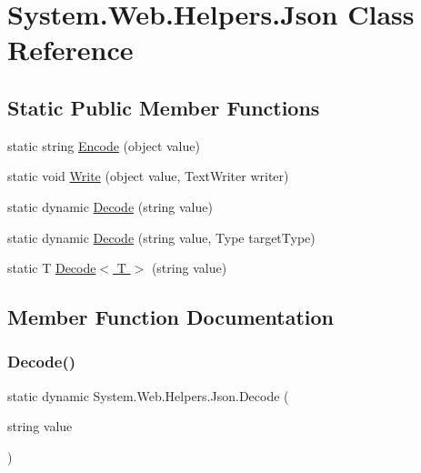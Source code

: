 \hypertarget{classSystem_1_1Web_1_1Helpers_1_1Json}{}\section{System.\+Web.\+Helpers.\+Json Class Reference}
\label{classSystem_1_1Web_1_1Helpers_1_1Json}
\subsection*{Static Public Member Functions}
\begin{DoxyCompactItemize}
\item 
static string \hyperlink{classSystem_1_1Web_1_1Helpers_1_1Json_a5234a572ff14b4546aca4a7ff265e9b5_a5234a572ff14b4546aca4a7ff265e9b5}{Encode} (object value)
\item 
static void \hyperlink{classSystem_1_1Web_1_1Helpers_1_1Json_a461c4677a0c7755a390cbe247d2cb106_a461c4677a0c7755a390cbe247d2cb106}{Write} (object value, Text\+Writer writer)
\item 
static dynamic \hyperlink{classSystem_1_1Web_1_1Helpers_1_1Json_a3a8e1162819227b88cbd2879cc05ecec_a3a8e1162819227b88cbd2879cc05ecec}{Decode} (string value)
\item 
static dynamic \hyperlink{classSystem_1_1Web_1_1Helpers_1_1Json_ab39872b59b78d9c417d2d81504768849_ab39872b59b78d9c417d2d81504768849}{Decode} (string value, Type target\+Type)
\item 
static T \hyperlink{classSystem_1_1Web_1_1Helpers_1_1Json_abd82655d76fcb16522303f1da4ced6c0_abd82655d76fcb16522303f1da4ced6c0}{Decode$<$ T $>$} (string value)
\end{DoxyCompactItemize}


\subsection{Member Function Documentation}
\mbox{\label{classSystem_1_1Web_1_1Helpers_1_1Json_a3a8e1162819227b88cbd2879cc05ecec_a3a8e1162819227b88cbd2879cc05ecec}} 
\subsubsection{\texorpdfstring{Decode()}{Decode()}\hspace{0.1cm}{\footnotesize\ttfamily [1/2]}}
{\footnotesize\ttfamily static dynamic System.\+Web.\+Helpers.\+Json.\+Decode (\begin{DoxyParamCaption}\item[{string}]{value }\end{DoxyParamCaption})\hspace{0.3cm}{\ttfamily [static]}}

